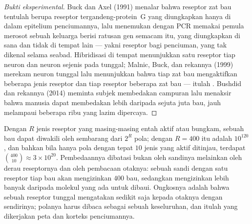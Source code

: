 \begin{proof}[Bukti eksperimental]
Buck dan Axel (1991) menalar bahwa reseptor zat bau tentulah berupa
reseptor tergandeng-protein~G yang diungkapkan hanya di dalam epitelium penciumannya,
lalu menemukan dengan PCR memakai pemula merosot sebuah keluarga berisi ratusan
gen semacam itu, yang diungkapkan di sana dan tidak di tempat lain --- yakni reseptor bagi
penciuman, yang tak dikenal selama seabad. Hibridisasi di tempat menunjukkan satu reseptor
tiap neuron dan  neuron sejenis pada  tunggal;
Malnic, Buck, dan rekannya (1999) merekam neuron tunggal lalu menunjukkan
bahwa tiap zat bau mengaktifkan beberapa jenis reseptor dan tiap reseptor
beberapa zat bau --- itulah . Bushdid dan rekannya
(2014) meminta subjek membedakan campuran lalu menaksir bahwa
manusia dapat membedakan lebih daripada sejuta juta bau, jauh melampaui
beberapa ribu yang lazim dipercaya.
\end{proof}

\begin{proposition}\label{prop:b3:sensory-systems:combinatorial}
Dengan $R$ jenis reseptor yang masing-masing entah aktif atau bungkam, sebuah bau dapat
diwakili oleh sembarang dari $2^{R}$ pola; dengan $R = 400$ itu adalah
$10^{120}$, dan bahkan bila hanya pola dengan tepat $10$ jenis yang aktif
ditinjau, terdapat $\binom{400}{10} \approx 3\times 10^{20}$.
Pembedaannya dibatasi bukan oleh sandinya melainkan oleh derau
reseptornya dan oleh pembacaan otaknya: sebuah sandi  dengan satu
reseptor tiap bau akan mengizinkan $400$ bau, sedangkan 
mengizinkan lebih banyak daripada molekul yang ada untuk dibaui. Ongkosnya adalah bahwa sebuah
reseptor tunggal mengatakan sedikit saja kepada otaknya dengan sendirinya; polanya harus
dibaca sebagai sebuah keseluruhan, dan itulah yang dikerjakan peta  dan korteks
penciumannya.
\end{proposition}

